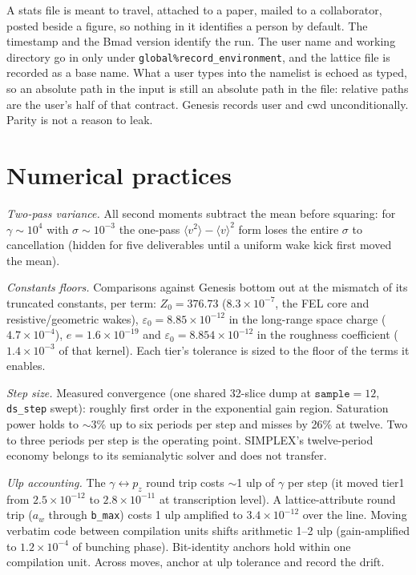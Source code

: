 \documentclass[11pt]{article}
\newcommand{\code}[1]{\texttt{#1}}
\begin{document}
A stats file is meant to travel, attached to a paper, mailed to a collaborator, posted
beside a figure, so nothing in it identifies a person by default. The timestamp and the
Bmad version identify the run. The user name and working directory go in only under
\texttt{global\%record\_environment}, and the lattice file is recorded as a base name.
What a user types into the namelist is echoed as typed, so an absolute path in the input
is still an absolute path in the file: relative paths are the user's half of that
contract. Genesis records user and cwd unconditionally. Parity is not a reason to leak.

\section{Numerical practices}\label{sec:numerics}

\emph{Two-pass variance.} All second moments subtract the mean before squaring: for
$\gamma \sim 10^4$ with $\sigma \sim 10^{-3}$ the one-pass
$\langle v^2\rangle - \langle v\rangle^2$ form loses the entire $\sigma$ to
cancellation (hidden for five deliverables until a uniform wake kick first moved the
mean).

\emph{Constants floors.} Comparisons against Genesis bottom out at the mismatch of
its truncated constants, per term: $Z_0 = 376.73$ ($8.3\times10^{-7}$, the FEL core
and resistive/geometric wakes), $\varepsilon_0 = 8.85\times10^{-12}$ in the
long-range space charge ($4.7\times10^{-4}$), $e = 1.6\times10^{-19}$ and
$\varepsilon_0 = 8.854\times10^{-12}$ in the roughness coefficient
($1.4\times10^{-3}$ of that kernel). Each tier's tolerance is sized to the floor of
the terms it enables.

\emph{Step size.} Measured convergence (one shared 32-slice dump at
$\code{sample}=12$, \code{ds\_step} swept): roughly first order in the exponential
gain region. Saturation power holds to $\sim$3\% up to six periods per step and
misses by 26\% at twelve. Two to three periods per step is the operating point.
SIMPLEX's twelve-period economy belongs to its semianalytic solver and does not
transfer.

\emph{Ulp accounting.} The $\gamma \leftrightarrow p_z$ round trip costs $\sim$1 ulp
of $\gamma$ per step (it moved tier1 from $2.5\times10^{-12}$ to
$2.8\times10^{-11}$ at transcription level). A lattice-attribute round trip
($a_w$ through \code{b\_max}) costs 1 ulp amplified to $3.4\times10^{-12}$ over the
line. Moving verbatim code between compilation units shifts arithmetic 1--2 ulp
(gain-amplified to $1.2\times10^{-4}$ of bunching phase). Bit-identity anchors hold
within one compilation unit. Across moves, anchor at ulp tolerance and record the
drift.
\end{document}
